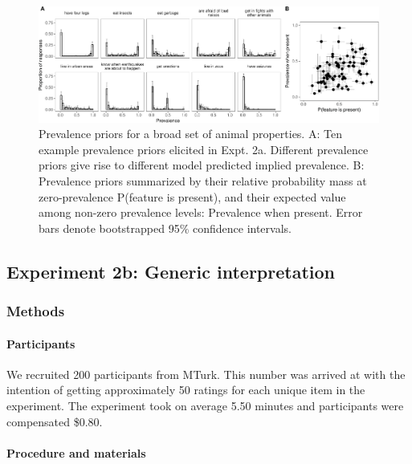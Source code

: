 \documentclass[floatsintext,doc]{apa6}
\theoremstyle{definition}
\theoremstyle{definition}
\theoremstyle{definition}
\theoremstyle{remark}
\begin{document}
\begin{figure}
\centering
\includegraphics{genint_files/figure-latex/genInt-prevPrior-1.pdf}
\caption{\label{fig:genInt-prevPrior}Prevalence priors for a broad set of
animal properties. A: Ten example prevalence priors elicited in Expt.
2a. Different prevalence priors give rise to different model predicted
implied prevalence. B: Prevalence priors summarized by their relative
probability mass at zero-prevalence P(feature is present), and their
expected value among non-zero prevalence levels: Prevalence when
present. Error bars denote bootstrapped 95\% confidence intervals.}
\end{figure}

\subsection{Experiment 2b: Generic
interpretation}\label{experiment-2b-generic-interpretation}

\subsubsection{Methods}\label{methods-1}

\paragraph{Participants}\label{participants-3}

We recruited 200 participants from MTurk. This number was arrived at
with the intention of getting approximately 50 ratings for each unique
item in the experiment. The experiment took on average 5.50 minutes and
participants were compensated \$0.80.

\paragraph{Procedure and materials}\label{procedure-and-materials-3}
\end{document}
